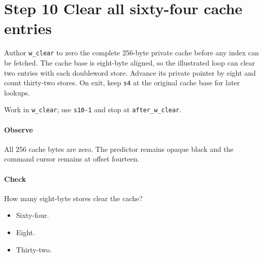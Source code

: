 \section{Step 10 Clear all sixty-four cache entries}\label{qoi-s10}
Author \texttt{w\_clear} to zero the complete 256-byte private cache before any index can be fetched. The cache base is eight-byte aligned, so the illustrated loop can clear two entries with each doubleword store. Advance its private pointer by eight and count thirty-two stores. On exit, keep \texttt{s4} at the original cache base for later lookups.

Work in \texttt{w\_clear}; use \texttt{s10-1} and stop at \texttt{after\_w\_clear}.

\paragraph{Observe} All 256 cache bytes are zero. The predictor remains opaque black and the command cursor remains at offset fourteen.

\paragraph{Check} How many eight-byte stores clear the cache?
\begin{itemize}
  \item[A.] Sixty-four.
  \item[B.] Eight.
  \item[C.] Thirty-two.
\end{itemize}
